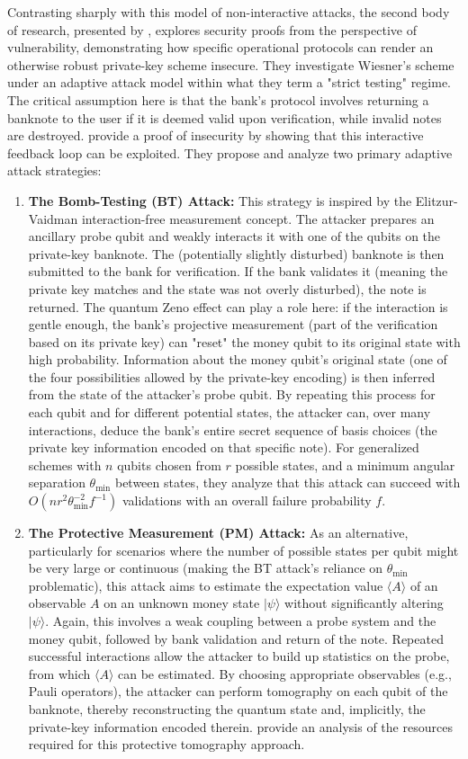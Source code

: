 \documentclass{article} %
\begin{document}
Contrasting sharply with this model of non-interactive attacks, the second body of research, presented by \citet{Nagaj2016Adaptive}, explores security proofs from the perspective of vulnerability, demonstrating how specific operational protocols can render an otherwise robust private-key scheme insecure. They investigate Wiesner's scheme under an adaptive attack model within what they term a "strict testing" regime. The critical assumption here is that the bank's protocol involves returning a banknote to the user if it is deemed valid upon verification, while invalid notes are destroyed. \citet{Nagaj2016Adaptive} provide a proof of insecurity by showing that this interactive feedback loop can be exploited. They propose and analyze two primary adaptive attack strategies:
\begin{enumerate}
    \item \textbf{The Bomb-Testing (BT) Attack:} This strategy is inspired by the Elitzur-Vaidman interaction-free measurement concept. The attacker prepares an ancillary probe qubit and weakly interacts it with one of the qubits on the private-key banknote. The (potentially slightly disturbed) banknote is then submitted to the bank for verification. If the bank validates it (meaning the private key matches and the state was not overly disturbed), the note is returned. The quantum Zeno effect can play a role here: if the interaction is gentle enough, the bank's projective measurement (part of the verification based on its private key) can "reset" the money qubit to its original state with high probability. Information about the money qubit's original state (one of the four possibilities allowed by the private-key encoding) is then inferred from the state of the attacker's probe qubit. By repeating this process for each qubit and for different potential states, the attacker can, over many interactions, deduce the bank's entire secret sequence of basis choices (the private key information encoded on that specific note). For generalized schemes with $n$ qubits chosen from $r$ possible states, and a minimum angular separation $\theta_{\min}$ between states, they analyze that this attack can succeed with $O(nr^2\theta_{\min}^{-2}f^{-1})$ validations with an overall failure probability $f$.
    \item \textbf{The Protective Measurement (PM) Attack:} As an alternative, particularly for scenarios where the number of possible states per qubit might be very large or continuous (making the BT attack's reliance on $\theta_{\min}$ problematic), this attack aims to estimate the expectation value $\langle A \rangle$ of an observable $A$ on an unknown money state $| \psi \rangle$ without significantly altering $| \psi \rangle$. Again, this involves a weak coupling between a probe system and the money qubit, followed by bank validation and return of the note. Repeated successful interactions allow the attacker to build up statistics on the probe, from which $\langle A \rangle$ can be estimated. By choosing appropriate observables (e.g., Pauli operators), the attacker can perform tomography on each qubit of the banknote, thereby reconstructing the quantum state and, implicitly, the private-key information encoded therein. \citet{Nagaj2016Adaptive} provide an analysis of the resources required for this protective tomography approach.

\end{enumerate}
\end{document}
